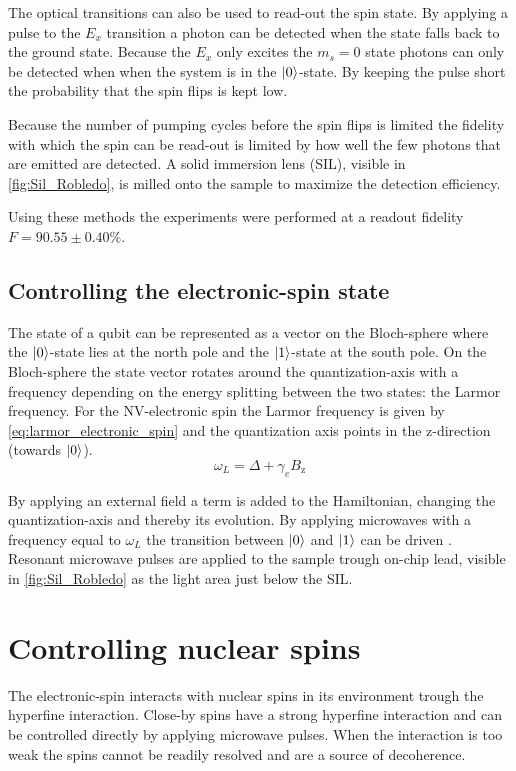 The optical transitions can also be used to read-out the spin state.
By applying a pulse to the $E_x$ transition a photon can be detected when the state falls back to the ground state.
Because the $E_x$ only excites the $m_s=0$ state photons can only be detected when when the system is in the ${\left\vert{0}\right\rangle}$-state.
By keeping the pulse short the probability that the spin flips is kept low.

Because the number of pumping cycles before the spin flips is limited the fidelity with which the spin can be read-out is limited by how well the few photons that are emitted are detected.
A solid immersion lens (SIL), visible in \cref{fig:Sil_Robledo}, is milled onto the sample to maximize the detection efficiency.

Using these methods the experiments were performed at a readout fidelity $F= 90.55 \pm 0.40 \%$.

\subsection{Controlling the electronic-spin state}
The state of a qubit can be represented as a vector on the Bloch-sphere where the ${\left\vert{0}\right\rangle}$-state lies at the north pole and the ${\left\vert{1}\right\rangle}$-state at the south pole.
On the Bloch-sphere the state vector rotates around the quantization-axis with a frequency depending on the energy splitting between the two states: the Larmor frequency.
For the NV-electronic spin the Larmor frequency is given by \cref{eq:larmor_electronic_spin} and the quantization axis points in the z-direction (towards ${\left\vert{0}\right\rangle}$).
\begin{equation}
    \omega_L =\Delta + \gamma_e {B_\mathrm{z}}
    \label{eq:larmor_electronic_spin}
\end{equation}

By applying an external field a term is added to the Hamiltonian, changing the quantization-axis and thereby its evolution.
By applying microwaves with a frequency equal to $\omega_L$ the transition between ${\left\vert{0}\right\rangle}$ and ${\left\vert{1}\right\rangle}$ can be driven \citep{Jelezko2004Observation}.
Resonant microwave pulses are applied to the sample trough on-chip lead, visible in \cref{fig:Sil_Robledo} as the light area just below the SIL.

\section{Controlling nuclear spins}
The electronic-spin interacts with nuclear spins in its environment trough the hyperfine interaction.
Close-by spins have a strong hyperfine interaction and can be controlled directly by applying microwave pulses.
When the interaction is too weak the spins cannot be readily resolved and are a source of decoherence.

